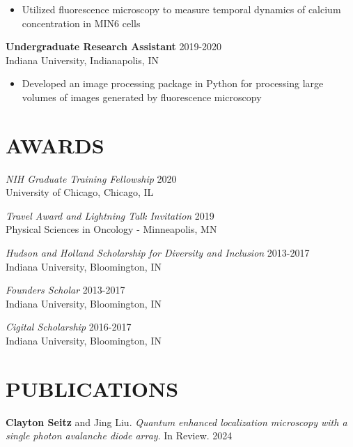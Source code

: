 \documentclass[margin, 10pt]{res} %
\begin{document}
\begin{resume}
\begin{itemize}
\item Utilized fluorescence microscopy to measure temporal dynamics of calcium concentration in MIN6 cells

 
\end{itemize}
 
\textbf{Undergraduate Research Assistant} \hfill 2019-2020\\
Indiana University, Indianapolis, IN
\begin{itemize} \itemsep -2pt

\item Developed an image processing package in Python for processing large volumes of images generated by fluorescence microscopy

\end{itemize} 



\section{AWARDS}

{\sl NIH Graduate Training Fellowship} \hfill 2020 \\
University of Chicago, Chicago, IL

{\sl Travel Award and Lightning Talk Invitation} \hfill 2019 \\
Physical Sciences in Oncology - Minneapolis, MN

{\sl Hudson and Holland Scholarship for Diversity and Inclusion} \hfill 2013-2017 \\
Indiana University, Bloomington, IN 

{\sl Founders Scholar} \hfill 2013-2017 \\
Indiana University, Bloomington, IN 

{\sl Cigital Scholarship} \hfill 2016-2017 \\
Indiana University, Bloomington, IN 

\section{PUBLICATIONS}

\textbf{Clayton Seitz} and Jing Liu. \textit{Quantum enhanced localization microscopy with a single photon avalanche diode array}. In Review. 2024


\end{resume}
\end{document}
